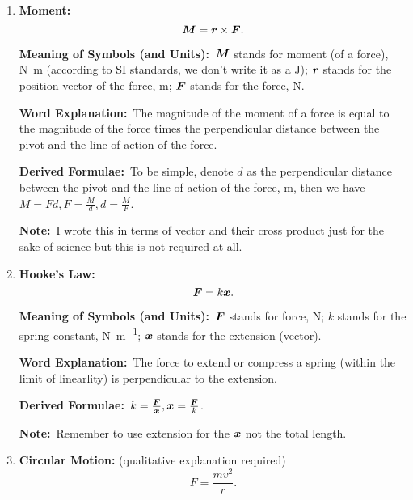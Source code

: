 \documentclass[8pt]{article}
\newcommand{\MeanSymb}{\textbf{Meaning of Symbols (and Units):}\ }
\newcommand{\WordExpl}{\textbf{Word Explanation:}\ }
\newcommand{\DeriForm}{\textbf{Derived Formulae:}\ }
\newcommand{\Note}{\textbf{Note:}\ }
\begin{document}
\begin{enumerate}
                \WordExpl Impulse is equal to the change in momentum.

                \DeriForm The following is derived from Newton's 2nd Law:
                \[
                    \vect{I} = \vect{F} \Delta t.
                \]

                \Note This is only meaningful if momentum is conserved - just like work and energy.

                \item \textbf{Moment:}
                \[
                    \boldsymbol{M} = \boldsymbol{r} \times \boldsymbol{F}.
                \]

                \MeanSymb \(\boldsymbol{M}\) stands for moment (of a force), \unit{\newton \metre} (according to SI standards, we don't write it as a \unit{\joule}); \(\boldsymbol{r}\) stands for the position vector of the force, \unit{\metre}; \(\boldsymbol{F}\) stands for the force, \unit{\newton}.

                \WordExpl The magnitude of the moment of a force is equal to the magnitude of the force times the perpendicular distance between the pivot and the line of action of the force.

                \DeriForm To be simple, denote \(d\) as the perpendicular distance between the pivot and the line of action of the force, \unit{\metre}, then we have \(M = Fd, F = \frac{M}{d}, d = \frac{M}{F}\).

                \Note I wrote this in terms of vector and their cross product just for the sake of science but this is not required at all.

                \item \textbf{Hooke's Law:}
                \[
                    \boldsymbol{F} = k \boldsymbol{x}.
                \]

                \MeanSymb \(\boldsymbol{F}\) stands for force, \unit{\newton}; \(k\) stands for the spring constant, \unit{\newton \per \metre}; \(\boldsymbol{x}\) stands for the extension (vector).

                \WordExpl The force to extend or compress a spring (within the limit of linearlity) is perpendicular to the extension.

                \DeriForm \(k = \frac{\boldsymbol{F}}{\boldsymbol{x}}, \boldsymbol{x} = \frac{\boldsymbol{F}}{k}\).

                \Note Remember to use extension for the \(\boldsymbol{x}\) not the total length.

                \item \textbf{Circular Motion:} (qualitative explanation required)
                \[
                    F = \frac{mv^2}{r}.
                \]


\end{enumerate}
\end{document}
